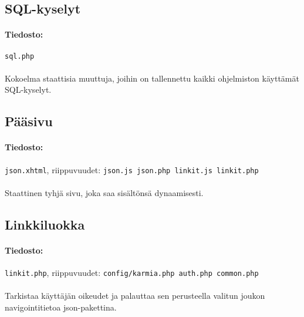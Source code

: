 \documentclass[11pt]{article}
\begin{document}

\subsection{SQL-kyselyt}

\paragraph{Tiedosto:} \large{\texttt{sql.php}}

\paragraph{} Kokoelma staattisia muuttuja, joihin on tallennettu kaikki ohjelmiston käyttämät SQL-kyselyt.


\subsection{Pääsivu}

\paragraph{Tiedosto:} \large{\texttt{json.xhtml}}, riippuvuudet: \texttt{json.js json.php linkit.js linkit.php}

\paragraph{} Staattinen tyhjä sivu, joka saa sisältönsä dynaamisesti.


\subsection{Linkkiluokka}

\paragraph{Tiedosto:} \large{\texttt{linkit.php}}, riippuvuudet: \texttt{config/karmia.php auth.php common.php}

\paragraph{} Tarkistaa käyttäjän oikeudet ja palauttaa sen perusteella valitun joukon navigointitietoa json-pakettina.
\end{document}
